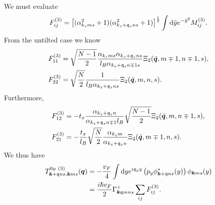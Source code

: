 We must evaluate
\begin{equation}
  \label{eq:126}
  F^{(3)}_{ij} = \left[(\alpha_{k_z m s}^2  + 1) ( \alpha_{k_z + \mathfrak{q}_z ns}^2 + 1 )\right]^{\frac{1}{2}} \int \mathrm{d} \tilde{y} e^{-\tilde{y}^2} M^{(3)}_{ij}.
\end{equation}
From the untilted case we know
\begin{align}
  F^{(3)}_{11} &= \sqrt{\frac{N-1}{2}}
                 \frac{\alpha_{k_z m s} \alpha_{k_z + \mathfrak{q}_z n s}}{l_{B} \alpha_{k_z + \mathfrak{q}_z n \mp 1 s}}
                 \Xi_2( \bar{\bm{q}}, m\mp 1, n\mp 1, s ),\\
  F^{(3)}_{22} &= \sqrt{\frac{N}{2}}
                 \frac{1}{l_{B} \alpha_{k_z + \mathfrak{q}_z n s}}
                 \Xi_{2} (\bar{\bm{q}}, m, n, s).
\end{align}
Furthermore,
\begin{align}
  F^{(3)}_{12} &= -t_x \frac{\alpha_{k_z + \mathfrak{q}_z n}}{\alpha_{k_z + \mathfrak{q}_z n \mp 1} l_{B}}
                 \sqrt{\frac{N-1}{2}}
                 \Xi_{2} (\bar{\bm{q}}, m, n \mp 1, s),\\
  F^{(3)}_{21} &= -\frac{t_x}{l_{B}}
                 \sqrt{\frac{N}{2}}
                 \frac{\alpha_{k_z m}}{\alpha_{k_z + \mathfrak{q}_z n}}
                 \Xi_2 ( \bar{\bm{q}}, m \mp 1, n, s ).
\end{align}
We thus have
\begin{align}
  \label{eq:127}
  T^{0y~(3)}_{\bm{k} + \mathfrak{q} ns, \bm{k} ms} (\bm{q})
  &= - \frac{v_F}{4}
    \int \mathrm{d} y
    e^{i q_y y}
    \left( p_y \phi ^{*}_{\bm{k} + \mathfrak{q} ns}(y) \right) \phi _{\bm{k} m s}(y)\\
  &= \frac{i \hbar v_F}{2}
    \Gamma ^{+}_{\bm{k} \mathfrak{q} m n s}
    \sum\limits_{ij}^{} F^{(3)}_{ij}.
\end{align}

